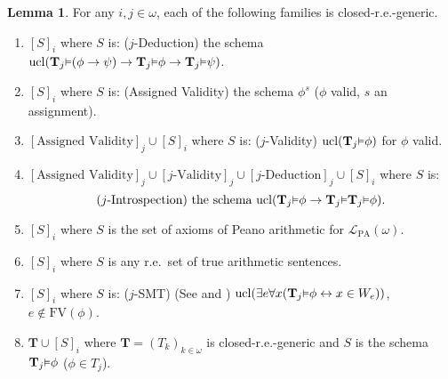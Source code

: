 \documentclass[reqno]{article}
\theoremstyle{definition}
\newtheorem{lemma}[theorem]{Lemma}
\def\L{\mathscr{L}}
\def\T{\mathbf{T}}
\def\FV{\mathrm{FV}}
\def\LPA{\L_{\mathrm{PA}}}
\renewcommand{\Pr}[1]{\T_{#1}\mbox{\small${\vDash}$}}
\newcommand{\ucl}[1]{\mathrm{ucl}(#1)}
\begin{document}
\begin{lemma}
\label{firstgrabbag}
For any $i,j\in \omega$,
each of the following families is closed-r.e.-generic.
\begin{enumerate}
\item $[S]_i$ where $S$ is: ($j$-Deduction) the schema $\ucl{\Pr 
j(\phi\rightarrow\psi)\rightarrow \Pr j\phi\rightarrow \Pr j\psi}$.
\item $[S]_i$ where $S$ is: (Assigned Validity) the schema $\phi^s$ ($\phi$ valid, $s$ an assignment).
\item $[\mbox{Assigned Validity}]_j\cup[S]_i$ where $S$ is: ($j$-Validity) $\ucl{\Pr j\phi}$ for $\phi$ valid.
\item $[\mbox{Assigned Validity}]_j\cup[\mbox{$j$-Validity}]_j\cup [\mbox{$j$-Deduction}]_j\cup [S]_i$ where $S$ is:
\[\mbox{($j$-Introspection) the schema $\ucl{\Pr j\phi\rightarrow\Pr j\Pr j\phi}$.}\]
\item $[S]_i$ where $S$ is the set of axioms of Peano arithmetic for $\LPA(\omega)$.
\item $[S]_i$ where $S$ is any r.e.~set of true arithmetic sentences.
\item $[S]_i$ where $S$ is: ($j$-SMT) (See \cite{carlson2000} and \cite{reinhardt}) $\ucl{\exists e\forall x(\Pr 
j\phi\leftrightarrow x\in W_e)}$, $e\not\in\FV(\phi)$.
\item $\T\cup [S]_i$ where $\T=(T_k)_{k\in\omega}$ is closed-r.e.-generic and $S$ is the schema $\Pr j\phi$ ($\phi\in T_j$).
\end{enumerate}
\end{lemma}
\end{document}
